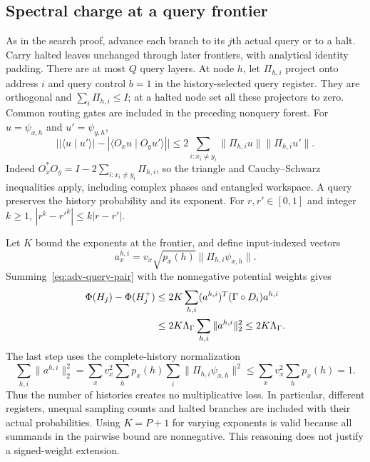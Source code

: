 \documentclass[11pt]{article}
\theoremstyle{remark}
\newcommand{\ip}[2]{\langle #1\mid #2\rangle}
\begin{document}
\subsection{Spectral charge at a query frontier}
As in the search proof, advance each branch to its $j$th actual query or
to a halt. Carry halted leaves unchanged through later frontiers, with
analytical identity padding. There are at most $Q$ query layers.
At node $h$, let $\Pi_{h,i}$ project onto address $i$ and query control
$b=1$ in the history-selected query register. They are orthogonal and
$\sum_i\Pi_{h,i}\le I$; at a halted node set all these projectors to zero.
Common routing gates are included in the preceding nonquery forest.
For $u=\psi_{x,h}$ and $u'=\psi_{y,h}$,
\begin{equation}\label{eq:adv-query-pair}
 \bigl||\ip{u}{u'}|-|\ip{O_xu}{O_yu'}|\bigr|
 \le 2\sum_{i:x_i\ne y_i}\|\Pi_{h,i}u\|\|\Pi_{h,i}u'\|.
\end{equation}
Indeed $O_x^*O_y=I-2\sum_{i:x_i\ne y_i}\Pi_{h,i}$, so the triangle
and Cauchy--Schwarz inequalities apply, including complex phases and
entangled workspace. A query preserves the history probability and its
exponent. For $r,r'\in[0,1]$ and integer $k\ge1$,
$|r^k-r'^k|\le k|r-r'|$.

Let $K$ bound the exponents at the frontier, and define input-indexed vectors
\[
 a_x^{h,i}=v_x\sqrt{p_x(h)}\|\Pi_{h,i}\psi_{x,h}\|.
\]
Summing~\eqref{eq:adv-query-pair} with the nonnegative potential weights gives
\begin{align}
 \Phi(H_j)-\Phi(H_j^+)
 &\le 2K\sum_{h,i}(a^{h,i})^T(\Gamma\circ D_i)a^{h,i}\notag\\
 &\le 2K\Lambda_\Gamma\sum_{h,i}\|a^{h,i}\|_2^2
 \le 2K\Lambda_\Gamma.\label{eq:adv-query-charge}
\end{align}
The last step uses the complete-history normalization
\begin{equation}\label{eq:adv-history-normalization}
 \sum_{h,i}\|a^{h,i}\|_2^2
 =\sum_xv_x^2\sum_h p_x(h)
               \sum_i\|\Pi_{h,i}\psi_{x,h}\|^2
 \le\sum_xv_x^2\sum_h p_x(h)=1.
\end{equation}
Thus the number of histories creates no multiplicative loss. In particular,
different registers, unequal sampling counts and halted branches are
included with their actual probabilities. Using $K=P+1$ for varying
exponents is valid because all summands in the pairwise bound are
nonnegative. This reasoning does not justify a signed-weight extension.
\end{document}

